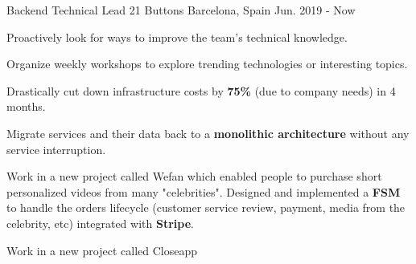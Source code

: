 

\begin{cventries}

  \cventry
    {Backend Technical Lead} %
    {21 Buttons} %
    {Barcelona, Spain} %
    {Jun. 2019 - Now} %
    {
      \begin{cvitems} %
        \item {Proactively look for ways to improve the team's technical knowledge.}
        \item {Organize weekly workshops to explore trending technologies or interesting topics.}
        \item {Drastically cut down infrastructure costs by \textbf{75\%} (due to company needs) in 4 months.}
        \item {Migrate services and their data back to a \textbf{monolithic architecture} without any service interruption.}
        \item {Work in a new project called Wefan which enabled people to purchase short personalized videos from many "celebrities". Designed and implemented a \textbf{FSM} to handle the orders lifecycle (customer service review, payment, media from the celebrity, etc) integrated with \textbf{Stripe}.}
        \item {Work in a new project called Closeapp }
        \item {}
        \item {}
      \end{cvitems}
    }


\end{cventries}
